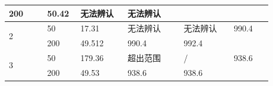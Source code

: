 \documentclass[UTF8,10pt,a4paper,fontset=fandol]{ctexart}
\newcommand{\fieldvalue}[1]{#1}
\newcommand{\handwritten}[1]{#1}
\begin{document}
\begin{tabular}{|p{0.13\linewidth}|p{0.10\linewidth}|p{0.16\linewidth}|p{0.19\linewidth}|p{0.17\linewidth}|p{0.13\linewidth}|}
\fieldvalue{\handwritten{200}} &
\fieldvalue{\handwritten{50.42}} &
\fieldvalue{\handwritten{无法辨认}} &
\fieldvalue{\handwritten{无法辨认}} &
\\ \hline
\multirow{2}{*}{2} &
\fieldvalue{\handwritten{50}} &
\fieldvalue{\handwritten{17.31}} &
\fieldvalue{\handwritten{无法辨认}} &
\fieldvalue{\handwritten{无法辨认}} &
\fieldvalue{\handwritten{990.4}}
\\ \cline{2-6}
&
\fieldvalue{\handwritten{200}} &
\fieldvalue{\handwritten{49.512}} &
\fieldvalue{\handwritten{990.4}} &
\fieldvalue{\handwritten{992.4}} &
\\ \hline
\multirow{2}{*}{3} &
\fieldvalue{\handwritten{50}} &
\fieldvalue{\handwritten{179.36}} &
\fieldvalue{\handwritten{超出范围}} &
\fieldvalue{\handwritten{/}} &
\fieldvalue{\handwritten{938.6}}
\\ \cline{2-6}
&
\fieldvalue{\handwritten{200}} &
\fieldvalue{\handwritten{49.53}} &
\fieldvalue{\handwritten{938.6}} &
\fieldvalue{\handwritten{938.6}} &
\\ \hline
\end{tabular}
\end{document}
